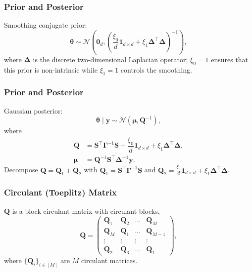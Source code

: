 \documentclass[aspectratio=169]{beamer}
\newcommand{\B}[1]{\mathbf{#1}} %
\newcommand{\Bs}[1]{\boldsymbol{#1}} %
\newcommand{\pr}[1]{\left(#1\right)} %
\begin{document}
\begin{frame}
  \frametitle{Prior and Posterior}
  Smoothing conjugate prior:
  \[\Bs{\theta} \sim \mathcal{N}(\B{0}_d, (\frac{\xi_0}{d}\B{1}_{d \times d} +  \xi_1\B{\Delta}^{\top}\B{\Delta})^{-1}), \] 
  where $\B{\Delta}$ is the discrete two-dimensional Laplacian operator; $\xi_0 = 1$ ensures that this prior is non-intrinsic while $\xi_1 = 1$ controls the smoothing.
\end{frame}

\begin{frame}
  \frametitle{Prior and Posterior}
  Gaussian posterior:
  \[\Bs{\theta} \mid \B{y} \sim \mathcal{N}\pr{\Bs{\mu},\B{Q}^{-1}},\]
  where
  \[\begin{aligned}
    \B{Q} &= \B{S}^{\top}\B{\Gamma}^{-1}\B{S} + \dfrac{\xi_0}{d}\B{1}_{d \times d} + \xi_1\B{\Delta}^{\top}\B{\Delta},\\
    \Bs{\mu} &= \B{Q}^{-1}\B{S}^{\top}\B{\Delta}^{-1}\B{y}.
  \end{aligned}\]
  Decompose $\B{Q} = \B{Q}_1 + \B{Q}_2$ with $\B{Q}_1 = \B{S}^{\top}\B{\Gamma}^{-1}\B{S}$ and $\B{Q}_2 = \frac{\xi_0}{d}\B{1}_{d \times d} + \xi_1\B{\Delta}^{\top}\B{\Delta}$.
\end{frame}

\begin{frame}
  \frametitle{Circulant (Toeplitz) Matrix}
  $\B{Q}$ is a block circulant matrix with circulant blocks,
\begin{equation}
  \B{Q} = \begin{pmatrix}
          \B{Q}_1 & \B{Q}_2 & \hdots & \B{Q}_M \\
          \B{Q}_M & \B{Q}_1 & \hdots & \B{Q}_{M-1} \\
          \vdots & \vdots & \vdots & \vdots \\
          \B{Q}_2 & \B{Q}_{3} & \hdots & \B{Q}_1
          \end{pmatrix},
\end{equation}
where $\{\B{Q}_{i}\}_{i \in [M]}$ are $M$ circulant matrices.
\end{frame}
\end{document}
